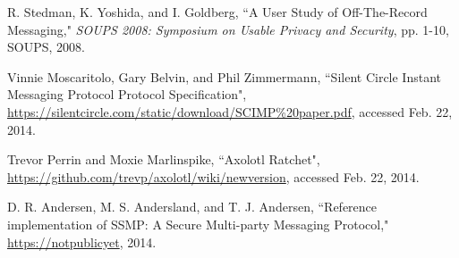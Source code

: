 \documentclass[%
preprint,
amsmath,amssymb,
aps,
prb,
floatfix,
]{revtex4-1}
\begin{document}
\begin{thebibliography}{99}
 R. Stedman, K. Yoshida, and I. Goldberg, ``A User Study of
Off-The-Record Messaging," \textit{SOUPS 2008: Symposium on Usable Privacy and
Security}, pp. 1-10, SOUPS, 2008.

  Vinnie Moscaritolo, Gary Belvin, and Phil Zimmermann,
``Silent Circle Instant Messaging Protocol Protocol Specification",
\url{https://silentcircle.com/static/download/SCIMP%20paper.pdf}, accessed Feb.
22, 2014.

 Trevor Perrin and Moxie Marlinspike, ``Axolotl Ratchet",
\url{https://github.com/trevp/axolotl/wiki/newversion}, accessed Feb. 22, 2014.

 D. R. Andersen, M. S. Andersland, and T.
J. Andersen, ``Reference implementation of SSMP: A Secure Multi-party Messaging
Protocol," \url{https://notpublicyet}, 2014.

\end{thebibliography}
\end{document}
